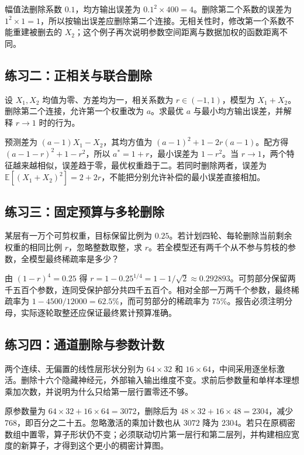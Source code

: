 \documentclass[UTF8,12pt,a4paper,fontset=fandol]{ctexart}
\begin{document}
\begin{solve}
幅值法删除系数 $0.1$，均方输出误差为 $0.1^2\times400=4$。删除第二个系数的误差为 $1^2\times1=1$，所以按输出误差应删除第二个连接。无相关性时，修改第一个系数不能重建被删去的 $X_2$；这个例子再次说明参数空间距离与数据加权的函数距离不同。
\end{solve}

\subsection{练习二：正相关与联合删除}
设 $X_1,X_2$ 均值为零、方差均为一，相关系数为 $r\in(-1,1)$，模型为 $X_1+X_2$。删除第二个连接，允许第一个权重改为 $a$。求最优 $a$ 与最小均方输出误差，并解释 $r\to1$ 时的行为。

\begin{solve}
预测差为 $(a-1)X_1-X_2$，其均方值为 $(a-1)^2+1-2r(a-1)$。配方得 $(a-1-r)^2+1-r^2$，所以 $a^*=1+r$，最小误差为 $1-r^2$。当 $r\to1$，两个特征越来越相似，误差趋于零，最优权重趋于二。若同时删除两者，误差为 $\mathbb E[(X_1+X_2)^2]=2+2r$，不能把分别允许补偿的最小误差直接相加。
\end{solve}

\subsection{练习三：固定预算与多轮删除}
某层有一万个可剪权重，目标保留比例为 $0.25$。若计划四轮、每轮删除当前剩余权重的相同比例 $r$，忽略整数取整，求 $r$。若全模型还有两千个从不参与剪枝的参数，全模型最终稀疏率是多少？

\begin{solve}
由 $(1-r)^4=0.25$ 得 $r=1-0.25^{1/4}=1-1/\sqrt2\approx0.292893$。可剪部分保留两千五百个参数，连同受保护部分共四千五百个。相对全部一万两千个参数，最终稀疏率为 $1-4500/12000=62.5\%$，而可剪部分的稀疏率为 $75\%$。报告必须注明分母，实际逐轮取整还应保证最终累计预算准确。
\end{solve}

\subsection{练习四：通道删除与参数计数}
两个连续、无偏置的线性层形状分别为 $64\times32$ 和 $16\times64$，中间采用逐坐标激活。删除十六个隐藏神经元，外部输入输出维度不变。求前后参数量和单样本理想乘加次数，并说明为什么只给第一层行置零还不够。

\begin{solve}
原参数量为 $64\times32+16\times64=3072$，删除后为 $48\times32+16\times48=2304$，减少 $768$，即百分之二十五。忽略激活的乘加计数也从 $3072$ 降为 $2304$。若只在原稠密数组中置零，算子形状仍不变；必须联动切片第一层行和第二层列，并构建相应宽度的新算子，才得到这个更小的稠密计算图。
\end{solve}
\end{document}
